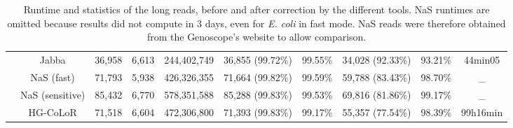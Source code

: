 \documentclass[long, final]{jobim2017}
\begin{document}
\begin{table}[ht]
\begin{center}
{\begin{tabular}{|c|c|c|c|c|c|c|c|c|c|}
		& Jabba & 36,958 & 6,613 & 244,402,749 & 36,855 (99.72\%) & 99.55\% & 34,028 (92.33\%) & 93.21\% & 44min05 \\
		& NaS (fast) & 71,793 & 5,938 & 426,326,355 & 71,664 (99.82\%) & 99.59\% & 59,788 (83.43\%) & 98.70\% & \_ \\
		& NaS (sensitive) & 85,432 & 6,770 & 578,351,588 & 85,288 (99.83\%) & 99.53\% & 69,816 (81.86\%) & 99.17\% & \_ \\
		& HG-CoLoR & 71,518 & 6,604 & 472,306,800 & 71,393 (99.83\%) & 99.17\% & 55,357 (77.54\%) & 98.39\% & 99h16min \\
		\hline
	\end{tabular}
	}
	\end{center}
	\caption{Runtime and statistics of the long reads, before and after correction by the different tools. 
	NaS runtimes are omitted because results did not compute in 3 days, even for \emph{E. coli} in fast mode. NaS reads 
	were therefore obtained from the Genoscope's website to allow comparison.
	\label{tabid}}
	
\end{table}
\end{document}

